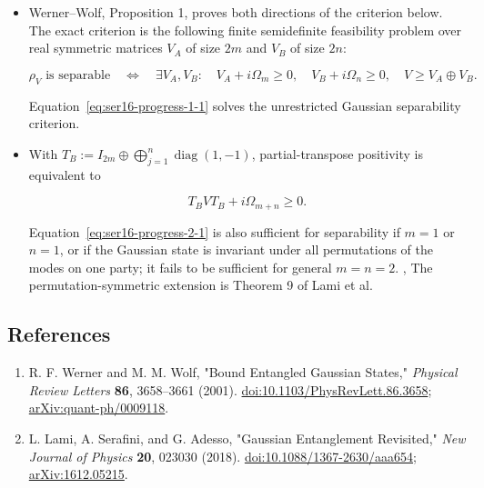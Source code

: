 \begin{itemize}
  \item Werner--Wolf, Proposition 1, proves both directions of the criterion below. The exact criterion is the following finite semidefinite feasibility problem over real symmetric matrices $V_A$ of size $2m$ and $V_B$ of size $2n$:

\begin{equation}
\rho_V\text{ is separable}
\quad\Longleftrightarrow\quad
\exists V_A,V_B:\quad V_A+i\Omega_m\geq0,\quad
V_B+i\Omega_n\geq0,\quad V\geq V_A\oplus V_B.
\label{eq:ser16-progress-1-1}
\end{equation}

Equation~\eqref{eq:ser16-progress-1-1} solves the unrestricted Gaussian separability criterion. 

  \item With $T_B:=I_{2m}\oplus\bigoplus_{j=1}^{n}\operatorname{diag}(1,-1)$, partial-transpose positivity is equivalent to

\begin{equation}
T_BVT_B+i\Omega_{m+n}\geq0.
\label{eq:ser16-progress-2-1}
\end{equation}

Equation~\eqref{eq:ser16-progress-2-1} is also sufficient for separability if $m=1$ or $n=1$, or if the Gaussian state is invariant under all permutations of the modes on one party; it fails to be sufficient for general $m=n=2$. ,  The permutation-symmetric extension is Theorem 9 of Lami et al. 
\end{itemize}

\subsection*{References}

\begin{enumerate}[label={},leftmargin=4.8em,labelsep=0.5em]
  \footnotesize
  \item[\textup{[WW01]}]\label{ref:ser16-1}
  R. F. Werner and M. M. Wolf, "Bound Entangled Gaussian States," \emph{Physical Review Letters} \textbf{86}, 3658--3661 (2001). \href{https://doi.org/10.1103/PhysRevLett.86.3658}{doi:10.1103/PhysRevLett.86.3658}; \href{https://arxiv.org/abs/quant-ph/0009118}{arXiv:quant-ph/0009118}.

  \item[\textup{[LSA18]}]\label{ref:ser16-2}
  L. Lami, A. Serafini, and G. Adesso, "Gaussian Entanglement Revisited," \emph{New Journal of Physics} \textbf{20}, 023030 (2018). \href{https://doi.org/10.1088/1367-2630/aaa654}{doi:10.1088/1367-2630/aaa654}; \href{https://arxiv.org/abs/1612.05215}{arXiv:1612.05215}.
\end{enumerate}

